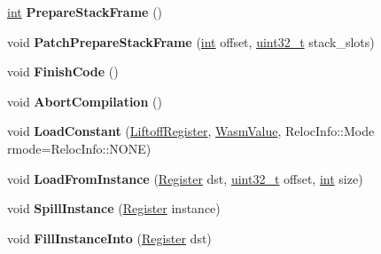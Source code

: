\begin{DoxyCompactItemize}
\mbox{\hyperlink{classint}{int}} {\bfseries Prepare\+Stack\+Frame} ()
\item 
\mbox{\label{classv8_1_1internal_1_1wasm_1_1LiftoffAssembler_af218b06fbfe8e3ad1c6f839939d341a1}} 
void {\bfseries Patch\+Prepare\+Stack\+Frame} (\mbox{\hyperlink{classint}{int}} offset, \mbox{\hyperlink{classuint32__t}{uint32\+\_\+t}} stack\+\_\+slots)
\item 
\mbox{\label{classv8_1_1internal_1_1wasm_1_1LiftoffAssembler_ac40f25920c5797b0369bf93bc9c00c4c}} 
void {\bfseries Finish\+Code} ()
\item 
\mbox{\label{classv8_1_1internal_1_1wasm_1_1LiftoffAssembler_a8d33dac229ea2cdb040aa0cd96793387}} 
void {\bfseries Abort\+Compilation} ()
\item 
\mbox{\label{classv8_1_1internal_1_1wasm_1_1LiftoffAssembler_a74feead6c3350782a1651e543439456d}} 
void {\bfseries Load\+Constant} (\mbox{\hyperlink{classv8_1_1internal_1_1wasm_1_1LiftoffRegister}{Liftoff\+Register}}, \mbox{\hyperlink{classv8_1_1internal_1_1wasm_1_1WasmValue}{Wasm\+Value}}, Reloc\+Info\+::\+Mode rmode=Reloc\+Info\+::\+N\+O\+NE)
\item 
\mbox{\label{classv8_1_1internal_1_1wasm_1_1LiftoffAssembler_a99127287a534a0a3328e21d4f75943cb}} 
void {\bfseries Load\+From\+Instance} (\mbox{\hyperlink{classv8_1_1internal_1_1Register}{Register}} dst, \mbox{\hyperlink{classuint32__t}{uint32\+\_\+t}} offset, \mbox{\hyperlink{classint}{int}} size)
\item 
\mbox{\label{classv8_1_1internal_1_1wasm_1_1LiftoffAssembler_a1663430d6d3d57b3645ea739a8176f7f}} 
void {\bfseries Spill\+Instance} (\mbox{\hyperlink{classv8_1_1internal_1_1Register}{Register}} instance)
\item 
\mbox{\label{classv8_1_1internal_1_1wasm_1_1LiftoffAssembler_a2482d2b81979df01e1552e0f11e08dd9}} 
void {\bfseries Fill\+Instance\+Into} (\mbox{\hyperlink{classv8_1_1internal_1_1Register}{Register}} dst)

\end{DoxyCompactItemize}
